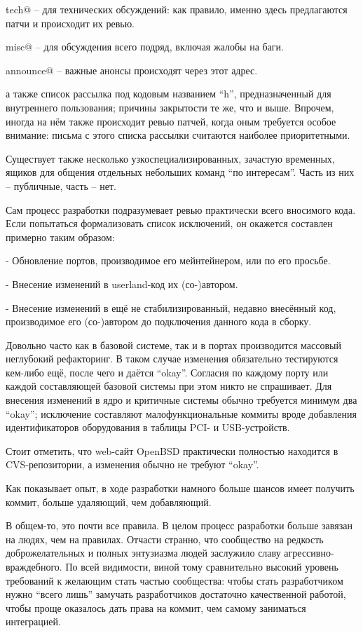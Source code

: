 \documentclass[10pt, a5paper]{article}
\begin{document}
tech@ -- для технических обсуждений: как правило, именно здесь предлагаются патчи и происходит их ревью.

misc@ -- для обсуждения всего подряд, включая жалобы на баги.

announce@ -- важные анонсы происходят через этот адрес.

а также список рассылка под кодовым названием ``h'', предназначенный для внутреннего пользования; причины закрытости те же, что и выше. Впрочем, иногда на нём также происходит ревью патчей, когда оным требуется особое внимание: письма с этого списка рассылки считаются наиболее приоритетными.

Существует также несколько узкоспециализированных, зачастую временных, ящиков для общения отдельных небольших команд ``по интересам''. Часть из них -- публичные, часть -- нет.

Сам процесс разработки подразумевает ревью практически всего вносимого кода. Если попытаться формализовать список исключений, он окажется составлен примерно таким образом:

- Обновление портов, производимое его мейнтейнером, или по его просьбе.

- Внесение изменений в userland-код их (со-)автором.

- Внесение изменений в ещё не стабилизированный, недавно внесённый код, производимое его (со-)автором до подключения данного кода в сборку.

Довольно часто как в базовой системе, так и в портах производится массовый неглубокий рефакторинг. В таком случае изменения обязательно тестируются кем-либо ещё, после чего и даётся ``okay''. Согласия по каждому порту или каждой составляющей базовой системы при этом никто не спрашивает. Для внесения изменений в ядро и критичные системы обычно требуется минимум два ``okay''; исключение составляют малофункциональные коммиты вроде добавления идентификаторов оборудования в таблицы PCI- и USB-устройств.

Стоит отметить, что web-сайт OpenBSD практически полностью находится в CVS-репозитории, а изменения обычно не требуют ``okay''.

Как показывает опыт, в ходе разработки намного больше шансов имеет получить коммит, больше удаляющий, чем добавляющий.

В общем-то, это почти все правила. В целом процесс разработки больше завязан на людях, чем на правилах. Отчасти странно, что сообщество на редкость доброжелательных и полных энтузиазма людей заслужило славу агрессивно-враждебного. По всей видимости, виной тому сравнительно высокий уровень требований к желающим стать частью сообщества: чтобы стать разработчиком нужно ``всего лишь'' замучать разработчиков достаточно качественной работой, чтобы проще оказалось дать права на коммит, чем самому заниматься интеграцией.
\end{document}
